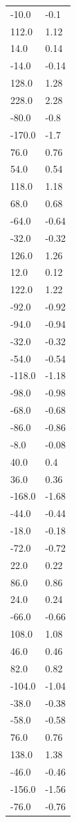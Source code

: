\begin{longtable}{ll}
-10.0 & -0.1 \\
112.0 & 1.12 \\
14.0 & 0.14 \\
-14.0 & -0.14 \\
128.0 & 1.28 \\
228.0 & 2.28 \\
-80.0 & -0.8 \\
-170.0 & -1.7 \\
76.0 & 0.76 \\
54.0 & 0.54 \\
118.0 & 1.18 \\
68.0 & 0.68 \\
-64.0 & -0.64 \\
-32.0 & -0.32 \\
126.0 & 1.26 \\
12.0 & 0.12 \\
122.0 & 1.22 \\
-92.0 & -0.92 \\
-94.0 & -0.94 \\
-32.0 & -0.32 \\
-54.0 & -0.54 \\
-118.0 & -1.18 \\
-98.0 & -0.98 \\
-68.0 & -0.68 \\
-86.0 & -0.86 \\
-8.0 & -0.08 \\
40.0 & 0.4 \\
36.0 & 0.36 \\
-168.0 & -1.68 \\
-44.0 & -0.44 \\
-18.0 & -0.18 \\
-72.0 & -0.72 \\
22.0 & 0.22 \\
86.0 & 0.86 \\
24.0 & 0.24 \\
-66.0 & -0.66 \\
108.0 & 1.08 \\
46.0 & 0.46 \\
82.0 & 0.82 \\
-104.0 & -1.04 \\
-38.0 & -0.38 \\
-58.0 & -0.58 \\
76.0 & 0.76 \\
138.0 & 1.38 \\
-46.0 & -0.46 \\
-156.0 & -1.56 \\
-76.0 & -0.76 \\

\end{longtable}
